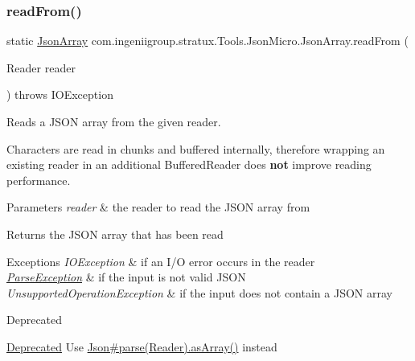 \subsubsection{\texorpdfstring{read\+From()}{readFrom()}\hspace{0.1cm}{\footnotesize\ttfamily [1/2]}}
{\footnotesize\ttfamily static \hyperlink{classcom_1_1ingeniigroup_1_1stratux_1_1_tools_1_1_json_micro_1_1_json_array}{Json\+Array} com.\+ingeniigroup.\+stratux.\+Tools.\+Json\+Micro.\+Json\+Array.\+read\+From (\begin{DoxyParamCaption}\item[{Reader}]{reader }\end{DoxyParamCaption}) throws I\+O\+Exception\hspace{0.3cm}{\ttfamily [static]}}

Reads a J\+S\+ON array from the given reader. 

Characters are read in chunks and buffered internally, therefore wrapping an existing reader in an additional {\ttfamily Buffered\+Reader} does {\bfseries not} improve reading performance. 


\begin{DoxyParams}{Parameters}
{\em reader} & the reader to read the J\+S\+ON array from \\
\hline
\end{DoxyParams}
\begin{DoxyReturn}{Returns}
the J\+S\+ON array that has been read 
\end{DoxyReturn}

\begin{DoxyExceptions}{Exceptions}
{\em I\+O\+Exception} & if an I/O error occurs in the reader \\
\hline
{\em \hyperlink{classcom_1_1ingeniigroup_1_1stratux_1_1_tools_1_1_json_micro_1_1_parse_exception}{Parse\+Exception}} & if the input is not valid J\+S\+ON \\
\hline
{\em Unsupported\+Operation\+Exception} & if the input does not contain a J\+S\+ON array \\
\hline
\end{DoxyExceptions}
\begin{DoxyRefDesc}{Deprecated}
\item[\hyperlink{deprecated__deprecated000001}{Deprecated}]Use \hyperlink{classcom_1_1ingeniigroup_1_1stratux_1_1_tools_1_1_json_micro_1_1_json_a74a0f7ea199004578d58033d765481bb}{Json\#parse(\+Reader)}\hyperlink{classcom_1_1ingeniigroup_1_1stratux_1_1_tools_1_1_json_micro_1_1_json_value_a6f56d77a18407a765a64de05048bae54}{.as\+Array()} instead \end{DoxyRefDesc}
\mbox{\label{classcom_1_1ingeniigroup_1_1stratux_1_1_tools_1_1_json_micro_1_1_json_array_a7fd156d1dc6294a35e191503db03d755}} 
